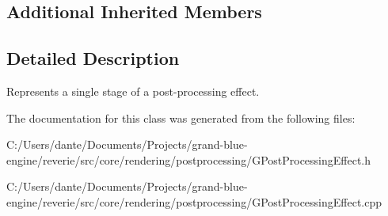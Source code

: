 \subsection*{Additional Inherited Members}


\subsection{Detailed Description}
Represents a single stage of a post-\/processing effect. 

The documentation for this class was generated from the following files\+:\begin{DoxyCompactItemize}
\item 
C\+:/\+Users/dante/\+Documents/\+Projects/grand-\/blue-\/engine/reverie/src/core/rendering/postprocessing/G\+Post\+Processing\+Effect.\+h\item 
C\+:/\+Users/dante/\+Documents/\+Projects/grand-\/blue-\/engine/reverie/src/core/rendering/postprocessing/G\+Post\+Processing\+Effect.\+cpp\end{DoxyCompactItemize}
